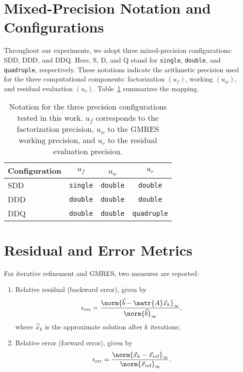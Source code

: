 \section{Mixed-Precision Notation and Configurations}
\label{sec:mixed-prec-notat}

Throughout our experiments, we adopt three mixed-precision configurations: SDD,
DDD, and DDQ. Here, S, D, and Q stand for \texttt{single}, \texttt{double}, and
\texttt{quadruple}, respectively. These notations indicate the arithmetic
precision used for the three computational components: factorization \((u_f)\),
working \((u_w)\), and residual evaluation \((u_r)\). Table~\ref{tab:notation}
summarizes the mapping.

\begin{table}[h]
  \centering
  \begin{tabular}{lccc}
    \toprule
    Configuration & \(u_f\)    & \(u_w\) ​   & \(u_r\)       \\
    \midrule
    SDD           & \texttt{single} & \texttt{double} & \texttt{double}    \\
    DDD           & \texttt{double} & \texttt{double} & \texttt{double}    \\
    DDQ           & \texttt{double} & \texttt{double} & \texttt{quadruple} \\
    \bottomrule
  \end{tabular}
  \caption[Precision configurations for mixed-precision IR]{Notation for the three
    precision configurations tested in this work. \(u_f\) corresponds to the
    factorization precision, \(u_w\) to the GMRES working precision, and \(u_r\)
    to the residual evaluation precision.}
  \label{tab:notation}
\end{table}


\section{Residual and Error Metrics}
\label{sec:resid-error-metr}

For iterative refinement and GMRES, two measures are reported:
\begin{enumerate}
\item Relative residual (backward error), given by \[\epsilon_{\text{res}} =
    \frac{\norm{\vec{b} - \matr{A}
        \vec{x}_k}_{\infty}}{\norm{\vec{b}}_{\infty}},\] where \(\vec{x}_k\) is
  the approximate solution after \(k\) iterations;
\item Relative error (forward error), given by \[\epsilon_{\text{err}} = \frac{\norm{\vec{x}_k -
        \vec{x}_{\text{ref}}}_{\infty}}{\norm{\vec{x}_{\text{ref}}}_{\infty}}.\]
\end{enumerate}

